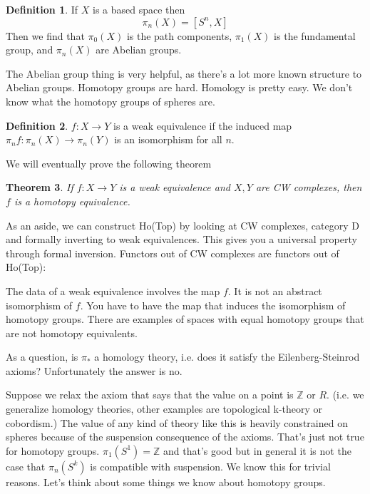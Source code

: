 \documentclass[12pt]{article}
\newtheorem{theorem}{Theorem}[section]
\theoremstyle{definition}
\newtheorem{definition}[theorem]{Definition}
\begin{document}
	\begin{definition}
		If $X$ is a based space then \[
		\pi_n(X)=[S^n,X]
		\]
		Then we find that $\pi_0(X)$ is the path components, $\pi_1(X)$ is the fundamental group, and $\pi_n(X)$ are Abelian groups. 
	\end{definition}
	The Abelian group thing is very helpful, as there's a lot more known structure to Abelian groups. Homotopy groups are hard. Homology is pretty easy. We don't know what the homotopy groups of spheres are. 
	\begin{definition}
		$f:X\to Y$ is a weak equivalence if the induced map $\pi_nf:\pi_n(X)\to \pi_n(Y)$ is an isomorphism for all $n$. 
	\end{definition}
	We will eventually prove the following theorem
	\begin{theorem}
		If $f:X\to Y$ is a weak equivalence and $X,Y$ are CW complexes, then $f$ is a homotopy equivalence. 
	\end{theorem}
	As an aside, we can construct \textsf{Ho(Top)} by looking at CW complexes, category \textsf{D} and formally inverting to weak equivalences. This gives you a universal property through formal inversion. Functors out of CW complexes are functors out of \textsf{Ho(Top)}:\begin{center}
	\end{center}
	The data of a weak equivalence involves the map $f$. It is not an abstract isomorphism of $f$. You have to have the map that induces the isomorphism of homotopy groups. There are examples of spaces with equal homotopy groups that are not homotopy equivalents. 
	
	As a question, is $\pi_*$ a homology theory, i.e. does it satisfy the Eilenberg-Steinrod axioms? Unfortunately the answer is no. 
	
	Suppose we relax the axiom that says that the value on a point is $\mathbb{Z}$ or $R$. (i.e. we generalize homology theories, other examples are topological k-theory or cobordism.) The value of any kind of theory like this is heavily constrained on spheres because of the suspension consequence of the axioms. That's just not true for homotopy groups. $\pi_1(S^1)=\mathbb{Z}$ and that's good but in general it is not the case that $\pi_n(S^k)$ is compatible with suspension. We know this for trivial reasons. Let's think about some things we know about homotopy groups. 
	
\end{document}
